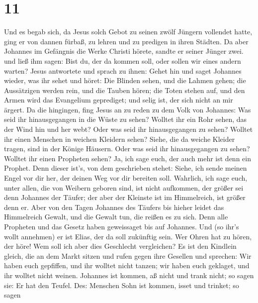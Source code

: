\hypertarget{section-10}{%
\section{11}\label{section-10}}

 Und es begab sich, da Jesus solch Gebot zu seinen zwölf
Jüngern vollendet hatte, ging er von dannen fürbaß, zu lehren und zu
predigen in ihren Städten.  Da aber Johannes im Gefängnis
die Werke Christi hörete, sandte er seiner Jünger zwei.  und
ließ ihm sagen: Bist du, der da kommen soll, oder sollen wir eines
andern warten?  Jesus antwortete und sprach zu ihnen: Gehet
hin und saget Johannes wieder, was ihr sehet und höret:  Die
Blinden sehen, und die Lahmen gehen; die Aussätzigen werden rein, und
die Tauben hören; die Toten stehen auf, und den Armen wird das
Evangelium geprediget;  und selig ist, der sich nicht an mir
ärgert.  Da die hingingen, fing Jesus an zu reden zu dem
Volk von Johannes: Was seid ihr hinausgegangen in die Wüste zu sehen?
Wolltet ihr ein Rohr sehen, das der Wind hin und her webt? 
Oder was seid ihr hinausgegangen zu sehen? Wolltet ihr einen Menschen in
weichen Kleidern sehen? Siehe, die da weiche Kleider tragen, sind in der
Könige Häusern.  Oder was seid ihr hinausgegangen zu sehen?
Wolltet ihr einen Propheten sehen? Ja, ich sage euch, der auch mehr ist
denn ein Prophet.  Denn dieser ist's, von dem geschrieben
stehet: Siehe, ich sende meinen Engel vor dir her, der deinen Weg vor
dir bereiten soll.  Wahrlich, ich sage euch, unter allen,
die von Weibern geboren sind, ist nicht aufkommen, der größer sei denn
Johannes der Täufer; der aber der Kleinste ist im Himmelreich, ist
größer denn er.  Aber von den Tagen Johannes des Täufers
bis hieher leidet das Himmelreich Gewalt, und die Gewalt tun, die reißen
es zu sich.  Denn alle Propheten und das Gesetz haben
geweissaget bis auf Johannes.  Und (so ihr's wollt
annehmen) er ist Elias, der da soll zukünftig sein.  Wer
Ohren hat zu hören, der höre!  Wem soll ich aber dies
Geschlecht vergleichen? Es ist den Kindlein gleich, die an dem Markt
sitzen und rufen gegen ihre Gesellen  und sprechen: Wir
haben euch gepfiffen, und ihr wolltet nicht tanzen; wir haben euch
geklaget, und ihr wolltet nicht weinen.  Johannes ist
kommen, aß nicht und trank nicht; so sagen sie: Er hat den Teufel.
 Des: Menschen Sohn ist kommen, isset und trinket; so sagen
